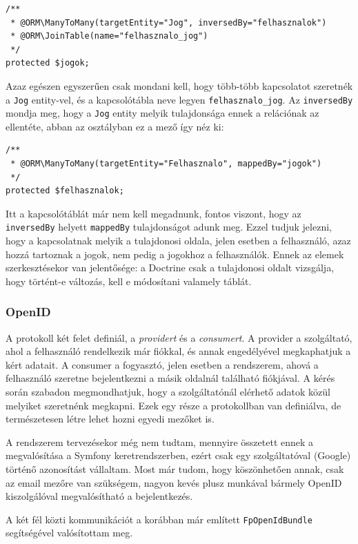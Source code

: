 \documentclass[a4paper,12pt,oneside]{report}
\begin{document}
\begin{lstlisting}
/**
 * @ORM\ManyToMany(targetEntity="Jog", inversedBy="felhasznalok")
 * @ORM\JoinTable(name="felhasznalo_jog")
 */
protected $jogok;
\end{lstlisting}

Azaz egészen egyszerűen csak mondani kell, hogy több-több kapcsolatot szeretnék a {\tt Jog} entity-vel, és a kapcsolótábla neve legyen {\tt felhasznalo\_jog}. Az {\tt inversedBy} mondja meg, hogy a {\tt Jog} entity melyik tulajdonsága ennek a relációnak az ellentéte, abban az osztályban ez a mező így néz ki:

\begin{lstlisting}
/**
 * @ORM\ManyToMany(targetEntity="Felhasznalo", mappedBy="jogok")
 */
protected $felhasznalok;
\end{lstlisting}

Itt a kapcsolótáblát már nem kell megadnunk, fontos viszont, hogy az {\tt inversedBy} helyett {\tt mappedBy} tulajdonságot adunk meg. Ezzel tudjuk jelezni, hogy a kapcsolatnak melyik a tulajdonosi oldala, jelen esetben a felhasználó, azaz hozzá tartoznak a jogok, nem pedig a jogokhoz a felhasználók. Ennek az elemek szerkesztésekor van jelentősége: a Doctrine csak a tulajdonosi oldalt vizsgálja, hogy történt-e változás, kell e módosítani valamely táblát.

\subsubsection*{OpenID}

A protokoll két felet definiál, a {\em providert} és a {\em consumert}. A provider a szolgáltató, ahol a felhasználó rendelkezik már fiókkal, és annak engedélyével megkaphatjuk a kért adatait. A consumer a fogyasztó, jelen esetben a rendszerem, ahová a felhasználó szeretne bejelentkezni a másik oldalnál található fiókjával. A kérés során szabadon megmondhatjuk, hogy a szolgáltatónál elérhető adatok közül melyiket szeretnénk megkapni. Ezek egy része a protokollban van definiálva, de természetesen létre lehet hozni egyedi mezőket is.

A rendszerem tervezésekor még nem tudtam, mennyire összetett ennek a megvalósítása a Symfony keretrendszerben, ezért csak egy szolgáltatóval (Google) történő azonosítást vállaltam. Most már tudom, hogy köszönhetően annak, csak az email mezőre van szükségem, nagyon kevés plusz munkával bármely OpenID kiszolgálóval megvalósítható a bejelentkezés.

A két fél közti kommunikációt a korábban már említett {\tt FpOpenIdBundle} segítségével valósítottam meg.
\end{document}
